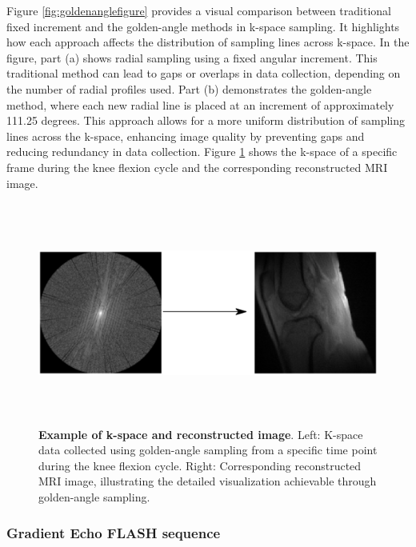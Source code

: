\documentclass{micro-econ-thesis}
\begin{document}
 
Figure \ref{fig:goldenanglefigure} provides a visual comparison between traditional fixed increment and the golden-angle methods in k-space sampling. It highlights how each approach affects the distribution of sampling lines across k-space. In the figure, part (a) shows radial sampling using a fixed angular increment. This traditional method can lead to gaps or overlaps in data collection, depending on the number of radial profiles used. Part (b) demonstrates the golden-angle method, where each new radial line is placed at an increment of approximately 111.25 degrees. This approach allows for a more uniform distribution of sampling lines across the k-space, enhancing image quality by preventing gaps and reducing redundancy in data collection. Figure \ref{fig:kspacearrow}  shows the k-space of a specific frame during the knee flexion cycle and the corresponding reconstructed MRI image.
\begin{figure}[H]
	\centering
	\includegraphics[width=0.9\linewidth, height=7.3cm]{kspace_arrow}
	\caption{\textbf{Example of k-space and reconstructed image}. Left: K-space data collected using golden-angle sampling from a specific time point during the knee flexion cycle. Right: Corresponding reconstructed MRI image, illustrating the detailed visualization achievable through golden-angle sampling.}
	\label{fig:kspacearrow}
\end{figure}
  
\subsubsection{Gradient Echo FLASH sequence}
\end{document}
